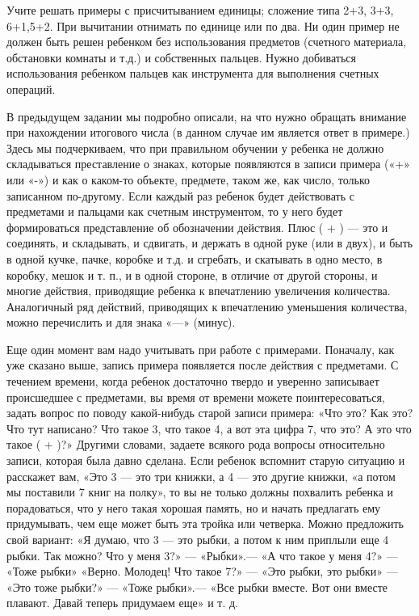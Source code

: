 \documentclass[a5paper]{book}
\begin{document}
Учите решать примеры с присчитыванием единицы; сложение типа 2+3, 3+3,
6+1,5+2. При вычитании отнимать по единице или по два. Ни один пример не
должен быть решен ребенком без использования предметов (счетного
материала, обстановки комнаты и т.д.) и собственных пальцев. Нужно
добиваться использования ребенком пальцев как инструмента для выполнения
счетных операций.

В предыдущем задании мы подробно описали, на что нужно обращать внимание
при нахождении итогового числа (в данном случае им является ответ в
примере.) Здесь мы подчеркиваем, что при правильном обучении у ребенка
не должно складываться преставление о знаках, которые появляются в
записи примера («+» или «-») и как о каком-то объекте, предмете, таком
же, как число, только записанном по-другому. Если каждый раз ребенок
будет действовать с предметами и пальцами как счетным инструментом, то у
него будет формироваться представление об обозначении действия. Плюс ( +
) --- это и соединять, и складывать, и сдвигать, и держать в одной руке
(или в двух), и быть в одной кучке, пачке, коробке и т.д. и сгребать, и
скатывать в одно место, в коробку, мешок и т. п., и в одной стороне, в
отличие от другой стороны, и многие действия, приводящие ребенка к
впечатлению увеличения количества. Аналогичный ряд действий, приводящих
к впечатлению уменьшения количества, можно перечислить и для знака «---»
(минус).

Еще один момент вам надо учитывать при работе с примерами. Поначалу, как
уже сказано выше, запись примера появляется после действия с предметами.
С течением времени, когда ребенок достаточно твердо и уверенно
записывает происшедшее с предметами, вы время от времени можете
поинтересоваться, задать вопрос по поводу какой-нибудь старой записи
примера: «Что это? Как это? Что тут написано? Что такое 3, что такое 4,
а вот эта цифра 7, что это? А это что такое ( + )?» Другими словами,
задаете всякого рода вопросы относительно записи, которая была давно
сделана. Если ребенок вспомнит старую ситуацию и расскажет вам, «Это 3
--- это три книжки, а 4 --- это другие книжки, «а потом мы поставили 7
книг на полку», то вы не только должны похвалить ребенка и порадоваться,
что у него такая хорошая память, но и начать предлагать ему придумывать,
чем еще может быть эта тройка или четверка. Можно предложить свой
вариант: «Я думаю, что 3 --- это рыбки, а потом к ним приплыли еще 4
рыбки. Так можно? Что у меня 3?» --- «Рыбки».--- «А что такое у меня 4?»
--- «Тоже рыбки» «Верно. Молодец! Что такое 7?» --- «Это рыбки, это
рыбки» --- «Это тоже рыбки?» --- «Тоже рыбки».--- «Все рыбки вместе. Вот
они вместе плавают. Давай теперь придумаем еще» и т. д.
\end{document}
